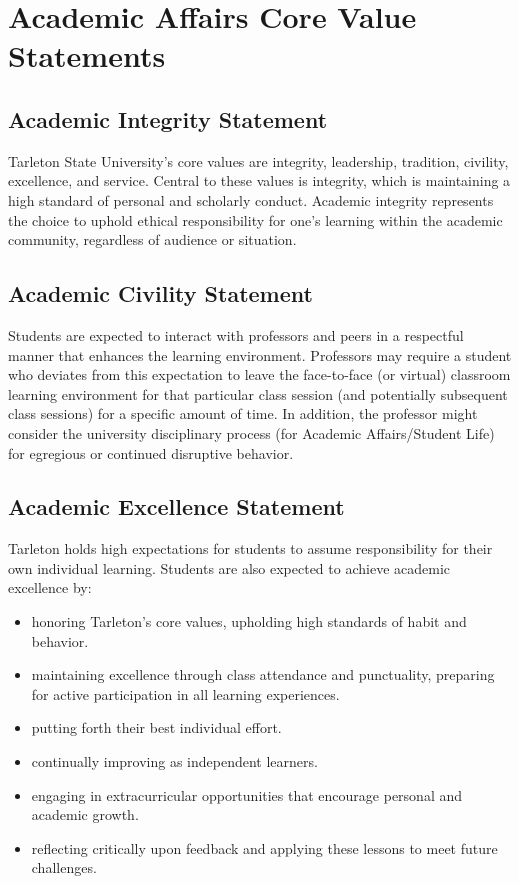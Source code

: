 \documentclass[10pt]{article}
\begin{document}
\section*{Academic Affairs Core Value Statements}
\label{sec:org774e330}
\subsection*{Academic Integrity Statement}
\label{sec:orgdfbed7e}
Tarleton State University's core values are integrity, leadership, tradition, civility, excellence, and service.  Central to these values is integrity, which is maintaining a high standard of personal and scholarly conduct.  Academic integrity represents the choice to uphold ethical responsibility for one’s learning within the academic community, regardless of audience or situation.

\subsection*{Academic Civility Statement}
\label{sec:orge3978bc}
Students are expected to interact with professors and peers in a respectful manner that enhances the learning environment. Professors may require a student who deviates from this expectation to leave the face-to-face (or virtual) classroom learning environment for that particular class session (and potentially subsequent class sessions) for a specific amount of time. In addition, the professor might consider the university disciplinary process (for Academic Affairs/Student Life) for egregious or continued disruptive behavior.

\subsection*{Academic Excellence Statement}
\label{sec:org14285ec}
Tarleton holds high expectations for students to assume responsibility for their own individual learning. Students are also expected to achieve academic excellence by:
\begin{itemize}
\item honoring Tarleton’s core values, upholding high standards of habit and behavior.
\item maintaining excellence through class attendance and punctuality, preparing for active participation in all learning experiences.
\item putting forth their best individual effort.
\item continually improving as independent learners.
\item engaging in extracurricular opportunities that encourage personal and academic growth.
\item reflecting critically upon feedback and applying these lessons to meet future challenges.
\end{itemize}
\end{document}
